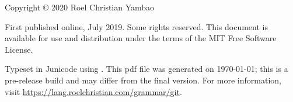 \thispagestyle{empty}

    \vspace*{\fill}
{
\small

\noindent Copyright © 2020 Roel Christian Yambao \bigskip

\noindent First published online, July 2019. Some rights reserved. This document is available for use and distribution under the terms of the MIT Free Software License.

\medskip

\noindent Typeset in Junicode using \LuaLaTeX{}. This {\sc pdf} file was generated on \today{}; this is a pre-release build and may differ from the final version. For more information, visit \url{https://lang.roelchristian.com/grammar/git}.

}
